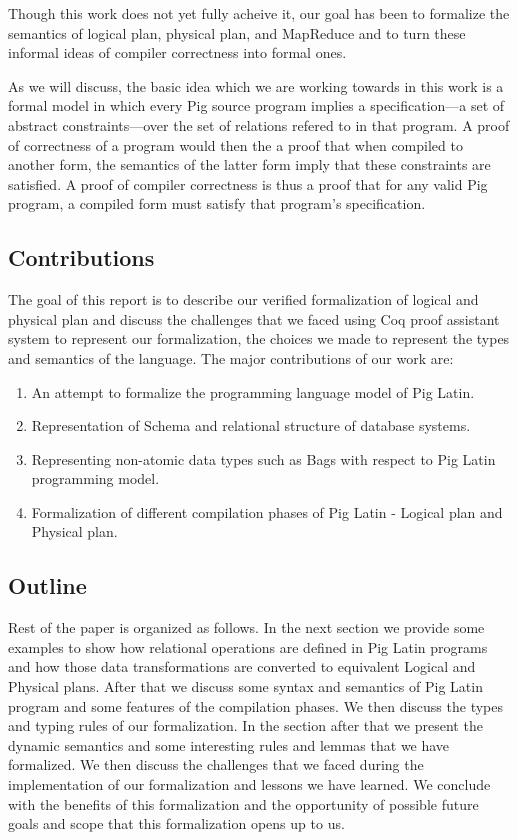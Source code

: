 Though this work does not yet fully acheive it, our goal has been to formalize the semantics of logical plan, physical plan, and MapReduce and to turn these informal ideas of compiler correctness into formal ones.

As we will discuss, the basic idea which we are working towards in this work is a formal model in which every Pig source program implies a specification---a set of abstract constraints---over the set of relations refered to in that program. A proof of correctness of a program would then the a proof that when compiled to another form, the semantics of the latter form imply that these constraints are satisfied. A proof of compiler correctness is thus a proof that for any valid Pig program, a compiled form must satisfy that program's specification.


\subsection{Contributions}
\label{subsec:contrib}

The goal of this report is to describe our verified formalization of logical and physical plan and discuss the challenges that we faced using Coq proof assistant system to represent our formalization, the choices we made to represent the types and semantics of the language.
The major contributions of our work are:
\begin{enumerate}
	\item An attempt to formalize the programming language model of Pig Latin.
	\item Representation of Schema and relational structure of database systems.
	\item Representing non-atomic data types such as Bags with respect to Pig Latin programming model.
	\item Formalization of different compilation phases of Pig Latin - Logical plan and Physical plan.
\end{enumerate}

\subsection{Outline}
\label{subsec:outline}

Rest of the paper is organized as follows. In the next section we provide some examples to show how relational operations are defined in Pig Latin programs and how those data transformations are converted to equivalent Logical and Physical plans. After that we discuss some syntax and semantics of Pig Latin program and some features of the compilation phases. We then discuss the types and typing rules of our formalization. In the section after that
we present the dynamic semantics and some interesting rules and lemmas that we have formalized. We then discuss the challenges that we faced during the implementation of our formalization and lessons we have learned. We conclude with the benefits of this formalization and the opportunity of possible future goals and scope that this formalization opens up to us.
